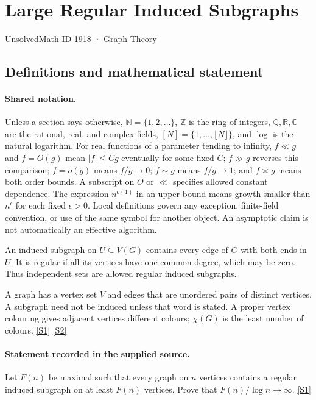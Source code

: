 \documentclass[11pt,a4paper]{article}
\newcommand{\N}{\mathbb{N}}
\newcommand{\Z}{\mathbb{Z}}
\newcommand{\Q}{\mathbb{Q}}
\newcommand{\R}{\mathbb{R}}
\newcommand{\C}{\mathbb{C}}
\newcommand{\sref}[2]{\hyperlink{source:#1:#2}{[S#2]}}
\begin{document}

\setcounter{section}{1917}

\section{Large Regular Induced Subgraphs}\label{1918}

{\small\sffamily UnsolvedMath ID 1918 · Graph Theory}

\subsection{Definitions and mathematical statement}

\paragraph{Shared notation.}Unless a section says otherwise, $\N=\{1,2,\ldots\}$,
$\Z$ is the ring of integers, $\Q,\R,\C$ are the rational, real, and complex
fields, $[N]=\{1,\ldots,\lfloor N\rfloor\}$, and $\log$ is the natural
logarithm. For real functions of a parameter tending to infinity,
$f\ll g$ and $f=O(g)$ mean $|f|\leq Cg$ eventually for some fixed $C$;
$f\gg g$ reverses this comparison; $f=o(g)$ means $f/g\to0$;
$f\sim g$ means $f/g\to1$; and $f\asymp g$ means both order bounds.
A subscript on $O$ or $\ll$ specifies allowed constant dependence.
The expression $n^{o(1)}$ in an upper bound means growth smaller than
$n^\epsilon$ for each fixed $\epsilon>0$. Local definitions govern any
exception, finite-field convention, or use of the same symbol for another
object. An asymptotic claim is not automatically an effective algorithm.



An induced subgraph on $U\subseteq V(G)$ contains every edge of $G$ with both ends in $U$. It is regular if all its vertices have one common degree, which may be zero. Thus independent sets are allowed regular induced subgraphs.

A graph has a vertex set $V$ and edges that are unordered pairs of distinct vertices. A subgraph need not be induced unless that word is stated. A proper vertex colouring gives adjacent vertices different colours; $\chi(G)$ is the least number of colours. \sref{1918}{1} \sref{1918}{2}

\paragraph{Statement recorded in the supplied source.}
Let $F(n)$ be maximal such that every graph on $n$ vertices contains a regular induced subgraph on at least $F(n)$ vertices. Prove that $F(n)/\log n\to \infty$. \sref{1918}{1}
\end{document}
